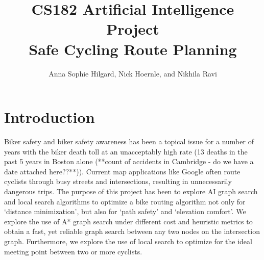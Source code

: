 \documentclass[11pt]{article}
\title{CS182 Artificial Intelligence Project \\ \Large{Safe Cycling Route Planning}}
\author{Anna Sophie Hilgard, Nick Hoernle, and Nikhila Ravi}
\begin{document}
\maketitle{}

\setlength{\parindent}{2em}
\setlength{\parskip}{1em}
\renewcommand{\baselinestretch}{1.3}

\section{Introduction}

Biker safety and biker safety awareness has been a topical issue for a number of years with the biker death toll at an unacceptably high rate (13 deaths in the past 5 years in Boston alone (**count of accidents in Cambridge - do we have a date attached here??**)). Current map applications like Google often route cyclists through busy streets and intersections, resulting in unnecessarily dangerous trips. The purpose of this project has been to explore AI graph search and local search algorithms to optimize a bike routing algorithm not only for `distance minimization', but also for `path safety' and `elevation comfort'. We explore the use of A* graph search under different cost and heuristic metrics to obtain a fast, yet reliable graph search between any two nodes on the intersection graph. Furthermore, we explore the use of local search to optimize for the ideal meeting point between two or more cyclists.




\end{document}
